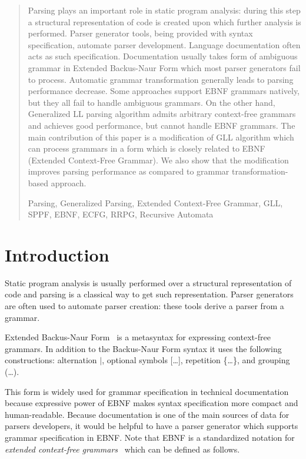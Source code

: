 \documentclass[runningheads,a4paper]{llncs}
\newcommand{\keywords}[1]{\par\addvspace\baselineskip
\noindent\keywordname\enspace\ignorespaces#1}
\begin{document}
\begin{abstract}
Parsing plays an important role in static program analysis: during this step a structural representation of code is created upon which further analysis is performed. 
Parser generator tools, being provided with syntax specification, automate parser development. 
Language documentation often acts as such specification. 
Documentation usually takes form of ambiguous grammar in Extended Backus-Naur Form which most parser generators fail to process. 
Automatic grammar transformation generally leads to parsing performance decrease. 
Some approaches support EBNF grammars natively, but they all fail to handle ambiguous grammars. 
On the other hand, Generalized LL parsing algorithm admits arbitrary context-free grammars and achieves good performance, but cannot handle EBNF grammars. 
The main contribution of this paper is a modification of GLL algorithm which can process grammars in a form which is closely related to EBNF (Extended Context-Free Grammar). 
We also show that the modification improves parsing performance as compared to grammar transformation-based approach. 

\keywords{Parsing, Generalized Parsing, Extended Context-Free Grammar, GLL, SPPF, EBNF, ECFG, RRPG, Recursive Automata}
\end{abstract}


\section{Introduction}%

Static program analysis is usually performed over a structural representation of code and parsing is a classical way to get such representation.
Parser generators are often used to automate parser creation: these tools derive a parser from a grammar.

Extended Backus-Naur Form~\cite{EBNFISO} is a metasyntax for expressing context-free grammars. 
In addition to the Backus-Naur Form syntax it uses the following constructions: alternation $\mid$, optional symbols [\dots], repetition \{\dots\}, and grouping (\dots).

This form is widely used for grammar specification in technical documentation because expressive power of EBNF makes syntax specification more compact and human-readable. 
Because documentation is one of the main sources of data for parsers developers, it would be helpful to have a parser generator which supports grammar specification in EBNF.
Note that EBNF is a standardized notation for \textit{extended context-free grammars}~\cite{ECFG} which can be defined as follows.
\end{document}
